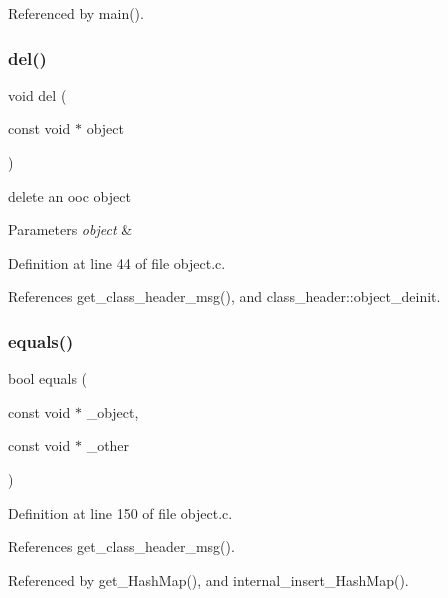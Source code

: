 Referenced by main().

\mbox{\label{group__common_gaa32332a11f6b26468e618db044b95f75}} 
\subsubsection{\texorpdfstring{del()}{del()}}
{\footnotesize\ttfamily void del (\begin{DoxyParamCaption}\item[{const void $\ast$}]{object }\end{DoxyParamCaption})}



delete an ooc object 


\begin{DoxyParams}{Parameters}
{\em object} & \\
\hline
\end{DoxyParams}


Definition at line 44 of file object.\+c.



References get\+\_\+class\+\_\+header\+\_\+msg(), and class\+\_\+header\+::object\+\_\+deinit.

\mbox{\label{group__common_ga4b83176929aeea62524d2a126d3c897f}} 
\subsubsection{\texorpdfstring{equals()}{equals()}}
{\footnotesize\ttfamily bool equals (\begin{DoxyParamCaption}\item[{const void $\ast$}]{\+\_\+object,  }\item[{const void $\ast$}]{\+\_\+other }\end{DoxyParamCaption})}



Definition at line 150 of file object.\+c.



References get\+\_\+class\+\_\+header\+\_\+msg().



Referenced by get\+\_\+\+Hash\+Map(), and internal\+\_\+insert\+\_\+\+Hash\+Map().

